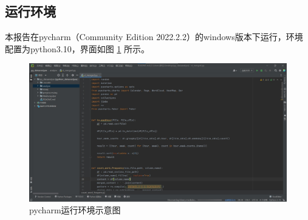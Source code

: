 \subsection{运行环境}
本报告在pycharm（Community Edition 2022.2.2）的windows版本下运行，环境配置为python3.10，界面如图 \ref{fig:pycharm} 所示。
\begin{figure}[H]
\centering
\includegraphics[width=15cm]{figure/environment_pycharm.jpg}
\caption{pycharm运行环境示意图} \label{fig:pycharm}
\end{figure}


